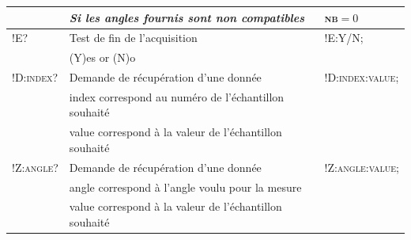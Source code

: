 \documentclass[a4paper,11pt,titlepage]{article} %
\begin{document}
\begin{center}
\begin{tabular}{|l|l|l|}
 & \textit{Si les angles fournis sont non compatibles} & \textsc{nb}$ = 0$ \\
\hline 
\textsc{!E?} & Test de fin de l'acquisition & \textsc{!E:Y/N;} \\
 &  (Y)es or (N)o &  \\  
\hline 
\textsc{!D:index?} & Demande de récupération d'une donnée & \textsc{!D:index:value;} \\
 &  index correspond au numéro de l'échantillon souhaité &  \\  
 &  value correspond à la valeur de l'échantillon souhaité &  \\  
\hline 
\textsc{!Z:angle?} & Demande de récupération d'une donnée & \textsc{!Z:angle:value;} \\
 &  angle correspond à l'angle voulu pour la mesure &  \\  
 &  value correspond à la valeur de l'échantillon souhaité &  \\  
\hline 
\end{tabular} 

\end{center}


\vfill
%
%
%
%	
\end{document}
